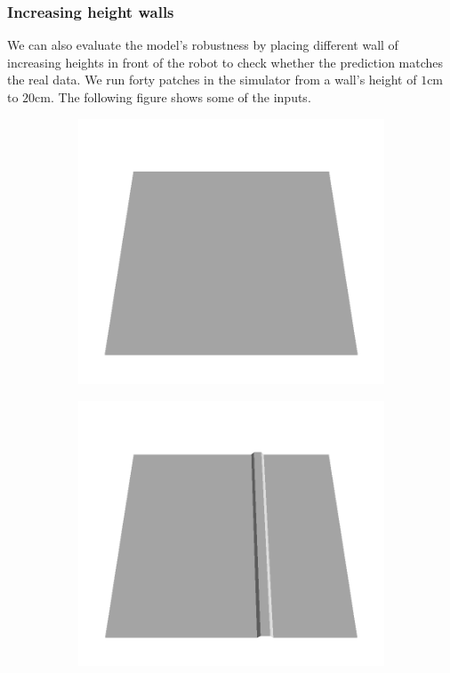 \documentclass[../document.tex]{subfiles}
\begin{document}
\subsubsection{Increasing height walls}
We can also evaluate the model's robustness by placing different wall  of increasing heights in front of the robot to check whether the prediction matches the real data. We run forty patches in the simulator from a wall's height of $1$cm to $20$cm. The following figure shows some of the inputs.

\begin{figure}[H]
    \centering
    \begin{subfigure}[b]{0.24\textwidth}
    \includegraphics[width=\linewidth]{../img/5/custom_patches/walls_increasing/all/00-3d.png}
    \end{subfigure}
    \begin{subfigure}[b]{0.24\textwidth}
    \includegraphics[width=\linewidth]{../img/5/custom_patches/walls_increasing/all/05-3d.png}

\end{subfigure}
\end{figure}
\end{document}
